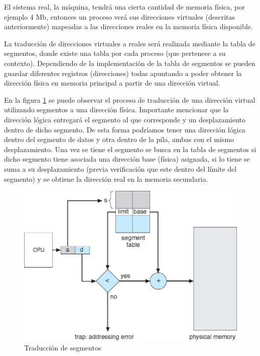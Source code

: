 El sistema real, la máquina, tendrá una cierta cantidad de memoria física, por
ejemplo 4 Mb, entonces un proceso verá sus direcciones virtuales (descritas
anteriormente) mapeadas a las direcciones reales en la memoria física
disponible.

La traducción de direcciones virtuales a reales será realizada mediante la tabla
de segmentos, donde existe una tabla por cada proceso (que pertenece a su
contexto). Dependiendo de la implementación de la tabla de segmentos se pueden
guardar diferentes registros (direcciones) todas apuntando a poder obtener la
dirección física en memoria principal a partir de una dirección virtual.

En la figura \ref{fig:tabla_segmentos} se puede observar el proceso de
traducción de una dirección virtual utilizando segmentos a una dirección física.
Importante mencionar que la dirección lógica entregará el segmento al que
corresponde y un desplazamiento dentro de dicho segmento. De esta forma
podríamos tener una dirección lógica dentro del segmento de datos y otra dentro
de la pila, ambas con el mismo desplazamiento. Una vez se tiene el segmento se
busca en la tabla de segmentos si dicho segmento tiene asociada una dirección
base (física) asignada, si lo tiene se suma a su desplazamiento (previa
verificación que este dentro del límite del segmento) y se obtiene la dirección
real en la memoria secundaria.

\begin{figure}[htbp]
\centering
\includegraphics[scale=1]{img/C07_memoria/tabla_segmentos.jpg}
\caption{Traducción de segmentos}
\label{fig:tabla_segmentos}
\end{figure}

